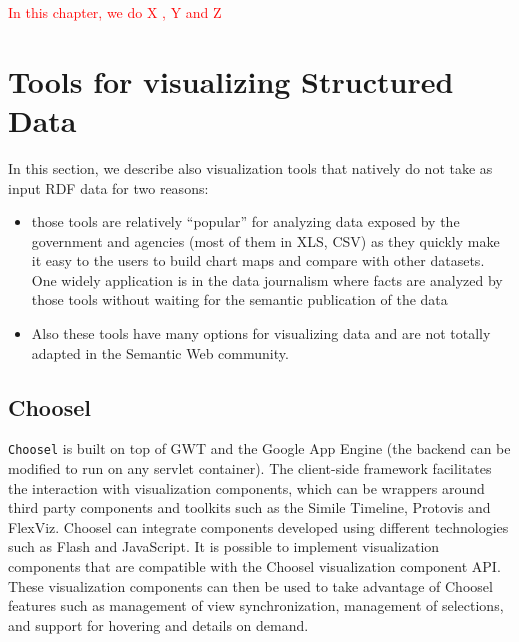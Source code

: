 \textcolor{red}{In this chapter, we do X , Y and Z }

\section{Tools for visualizing Structured Data}
\label{sec:strucdataviz}
In this section, we describe also visualization tools that natively do not take as input RDF data for two reasons: 
\begin{itemize}
\item those tools are relatively ``popular'' for analyzing data exposed by the government and agencies  (most of them in XLS, CSV) as they quickly make it easy to the users  to build chart  maps and compare with other datasets. One widely application is in the data journalism  where facts are analyzed by those tools without waiting for the semantic publication of the data 
\item Also these tools have many options for visualizing data and are not totally adapted in the Semantic Web community.

\end{itemize}

\subsection{Choosel}
\label{sec:choosel}

\texttt{Choosel} \cite{lars2010} is built on top of GWT  and the Google App Engine  (the backend can be modified to run on any servlet container). The client-side framework facilitates the interaction with visualization components, which can be wrappers around third party components and toolkits such as the Simile Timeline, Protovis and FlexViz. Choosel can integrate components developed using different technologies such as Flash and JavaScript. It is possible to implement visualization components that are compatible with the Choosel visualization component API. These visualization components can then be used to take advantage of Choosel features such as management of view synchronization, management of selections, and support for hovering and details on demand.

